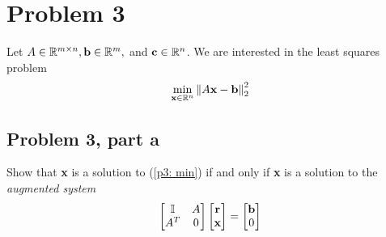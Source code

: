 \newpage
\section{Problem 3}
Let $A \in \mathbb{R}^{m \times n}, \textbf{b} \in \mathbb{R}^m,$ and $\textbf{c}\in \mathbb{R}^n$. We are interested in the least squares problem
\begin{align}
    \min_{\textbf{x}\in \mathbb{R}^n} \norm{A\textbf{x} - \textbf{b}}^2_2 \label{p3: min}
\end{align}
\subsection{Problem 3, part a}
Show that \textbf{x} is a solution to (\ref{p3: min}) if and only if \textbf{x} is a solution to the \textit{augmented system}
\begin{align}
    \begin{bmatrix}\mathbb{I} &A\\A^T&0\end{bmatrix}\begin{bmatrix}\textbf{r}\\\textbf{x}\end{bmatrix} = \begin{bmatrix}\textbf{b}\\0\end{bmatrix} \label{p3: augmented soln}
\end{align}
\partbreak
